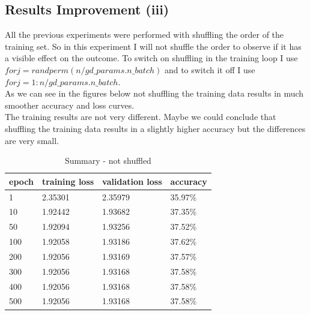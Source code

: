 \subsection{Results Improvement (iii)}
All the previous experiments were performed with shuffling the order of the training set. So in this experiment I will not shuffle the order to 
observe if it has a visible effect on the outcome. To switch on shuffling in the training loop I use \(for j=randperm(n/gd\_params.n\_batch)\) and to switch it off I use
\(for j=1:n/gd\_params.n\_batch\).\\
As we can see in the figures below not shuffling the training data results in much smoother accuracy and loss curves.\\
The training results are not very different. Maybe we could conclude that shuffling the training data results in a slightly higher accuracy but the differences are very small.
\begin{table}[ht]
\centering
\begin{tabular}{|l|l|l|l|}
\hline
\textbf{epoch} & \textbf{training loss} & \textbf{validation loss} & \textbf{accuracy} \\ \hline
1              & 2.35301                & 2.35979                  & 35.97\%           \\ \hline
10             & 1.92442                & 1.93682                  & 37.35\%           \\ \hline
50             & 1.92094                & 1.93256                  & 37.52\%           \\ \hline
100            & 1.92058                & 1.93186                  & 37.62\%           \\ \hline
200            & 1.92056                & 1.93169                  & 37.57\%           \\ \hline
300            & 1.92056                & 1.93168                  & 37.58\%           \\ \hline
400            & 1.92056                & 1.93168                  & 37.58\%           \\ \hline
500            & 1.92056                & 1.93168                  & 37.58\%           \\ \hline
\end{tabular}
\caption{Summary - not shuffled}
\label{not_shuffled}
\end{table}

